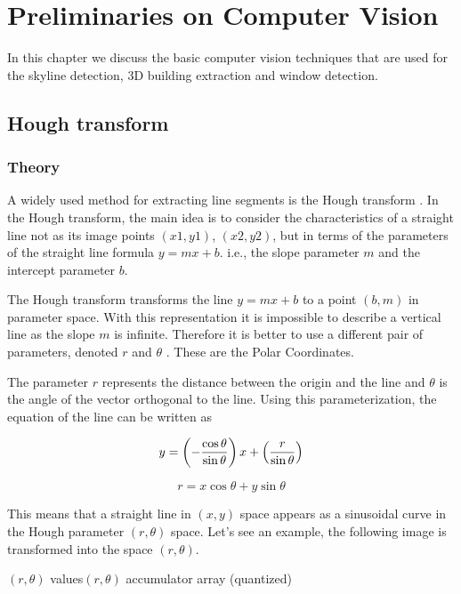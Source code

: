 \section{Preliminaries on Computer Vision}
In this chapter we discuss the basic computer vision techniques that are used for
the skyline detection, 3D building extraction and window detection.

\subsection{Hough transform}
\label{sec:prelimHough}
\subsubsection{Theory}
	A widely used method for extracting line segments is the Hough transform
	\cite{Hough}.
	In the Hough transform, the main idea is to consider the characteristics of a
	straight line not as its image points $(x1, y1)$, $(x2, y2)$, but in
	terms of the parameters of the straight line formula $y = mx + b$. i.e., the
	slope parameter $m$ and the intercept parameter $b$.


	The Hough transform transforms the line $y = mx + b$ 
	to a point $(b,m)$ in parameter space.
	With this representation it is impossible to describe a vertical line as 
	the slope $m$ is infinite.
	Therefore it is better to use a different pair of parameters, denoted $r$ and $\theta$ .  These are the Polar Coordinates.

	The parameter $r$ represents the distance between the origin and the line  and $\theta$ is the angle of the vector orthogonal to the line.
	Using this parameterization, the equation of the line can be written as

\[	    y = \left(-{\cos\theta\over\sin\theta}\right)x + \left({r\over{\sin\theta}}\right) \]

	\[r = x \cos \theta+y\sin \theta \]
	
	This means that a straight line in $(x,y)$ space appears as a sinusoidal
	curve in the Hough parameter $(r,\theta)$ space.  Let's see an example, the
	following image is transformed into the space $(r,\theta)$.
	
	 {$(r, \theta)$ values}{$(r, \theta)$ accumulator array (quantized)}

